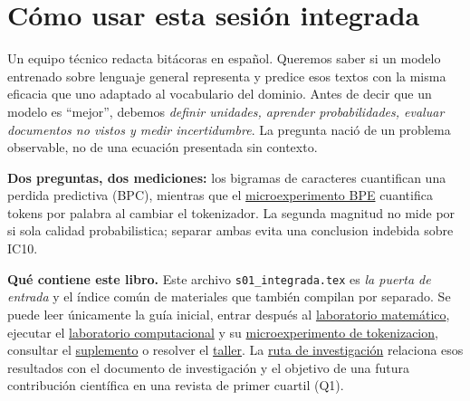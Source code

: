 
\chapter*{Cómo usar esta sesión integrada}
\label{mod:ruta}
\begin{idea}
Un equipo técnico redacta bitácoras en español. Queremos saber si un modelo entrenado
sobre lenguaje general representa y predice esos textos con la misma eficacia que uno
adaptado al vocabulario del dominio. Antes de decir que un modelo es ``mejor'', debemos
\emph{definir unidades, aprender probabilidades, evaluar documentos no vistos y medir incertidumbre}.
La pregunta nació de un problema observable, no de una ecuación presentada sin contexto.
\end{idea}
\begin{center}
\end{center}
\noindent\textbf{Dos preguntas, dos mediciones:} los bigramas de caracteres
cuantifican una perdida predictiva (BPC), mientras que el
\hyperref[lab:ic10]{microexperimento BPE} cuantifica tokens por palabra
al cambiar el tokenizador. La segunda magnitud no mide por si sola calidad
probabilistica; separar ambas evita una conclusion indebida sobre IC10.

\noindent\textbf{Qué contiene este libro.} Este archivo \texttt{s01\_integrada.tex} es
\emph{la puerta de entrada} y el índice común de materiales que también compilan
por separado. Se puede leer únicamente la guía inicial, entrar después al
\hyperref[lab:mat]{laboratorio matemático}, ejecutar el
\hyperref[lab:comp]{laboratorio computacional} y su
\hyperref[lab:ic10]{microexperimento de tokenizacion}, consultar el
\hyperref[mod:sup]{suplemento} o resolver el
\hyperref[mod:taller]{taller}. La \hyperref[mod:invest]{ruta de investigación}
relaciona esos resultados con el documento de investigación y el objetivo de una
futura contribución científica en una revista de primer cuartil (Q1).

